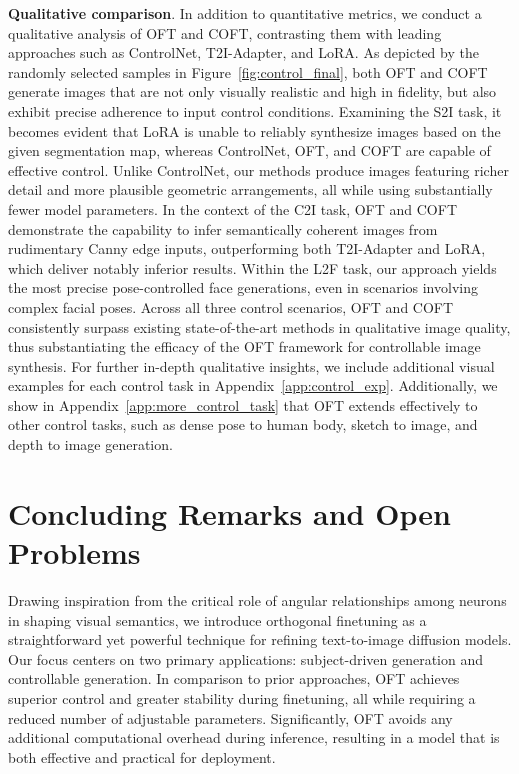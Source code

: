 \textbf{Qualitative comparison}. In addition to quantitative metrics, we conduct a qualitative analysis of OFT and COFT, contrasting them with leading approaches such as ControlNet, T2I-Adapter, and LoRA. As depicted by the randomly selected samples in Figure~\ref{fig:control_final}, both OFT and COFT generate images that are not only visually realistic and high in fidelity, but also exhibit precise adherence to input control conditions. Examining the S2I task, it becomes evident that LoRA is unable to reliably synthesize images based on the given segmentation map, whereas ControlNet, OFT, and COFT are capable of effective control. Unlike ControlNet, our methods produce images featuring richer detail and more plausible geometric arrangements, all while using substantially fewer model parameters. In the context of the C2I task, OFT and COFT demonstrate the capability to infer semantically coherent images from rudimentary Canny edge inputs, outperforming both T2I-Adapter and LoRA, which deliver notably inferior results. Within the L2F task, our approach yields the most precise pose-controlled face generations, even in scenarios involving complex facial poses. Across all three control scenarios, OFT and COFT consistently surpass existing state-of-the-art methods in qualitative image quality, thus substantiating the efficacy of the OFT framework for controllable image synthesis. For further in-depth qualitative insights, we include additional visual examples for each control task in Appendix~\ref{app:control_exp}. Additionally, we show in Appendix~\ref{app:more_control_task} that OFT extends effectively to other control tasks, such as dense pose to human body, sketch to image, and depth to image generation.

\section{Concluding Remarks and Open Problems}

Drawing inspiration from the critical role of angular relationships among neurons in shaping visual semantics, we introduce orthogonal finetuning as a straightforward yet powerful technique for refining text-to-image diffusion models. Our focus centers on two primary applications: subject-driven generation and controllable generation. In comparison to prior approaches, OFT achieves superior control and greater stability during finetuning, all while requiring a reduced number of adjustable parameters. Significantly, OFT avoids any additional computational overhead during inference, resulting in a model that is both effective and practical for deployment.

